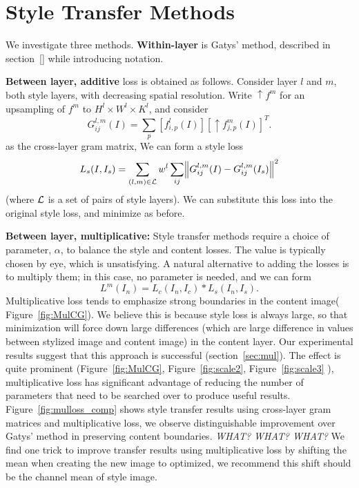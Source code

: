 \documentclass[runningheads]{llncs}
\begin{document}
\section{Style Transfer Methods}\label{sec:Cross}

We investigate three methods.  {\bf Within-layer}  is Gatys' method, described in section~\ref{} while introducing notation.

{\bf Between layer, additive} loss is obtained as follows.  Consider layer $l$ and $m$, both style layers, with decreasing
spatial resolution.  
Write $\uparrow f^{m}$ for an upsampling of  $f^m$ to $H^l\times W^l \times K^l$, and consider
\[
G_{ij}^{l,m}(I) = \sum_{p} \left[ f_{i,p}^l(I)\right]\left[\uparrow {f}_{j,p}^{m}(I)\right]^{T}.
\]
as the cross-layer gram matrix, We can form a style loss
\[
L_s(I, I_{s}) = \sum_{(l, m)\in {\cal L}} w^{l}\sum_{ij} \norm{G^{l,m}_{ij}(I)-G^{l,m}_{ij}(I_s)}^2
\]
(where ${\cal L}$ is a set of pairs of style layers).   We can substitute this loss into the original style loss, and
minimize as before. 

{\bf Between layer, multiplicative:} Style transfer methods require a choice of parameter, $\alpha$, to balance the style and content losses.   The value is
typically chosen by eye, which is unsatisfying.  A natural alternative to adding the losses is to multiply them; in this
case, no parameter is needed, and we can form
\[
L^m(I_n) = L_c(I_n, I_c) *  L_s(I_n, I_s).
\]
Multiplicative loss tends to emphasize strong boundaries in the content image( Figure~\ref{fig:MulCG}). We believe this
is because style loss is always large, so that minimization will force down large differences (which are large
difference in values between stylized image and content image) in the content layer.  Our experimental results suggest
that this approach is successful (section~\ref{sec:mul}).  The effect is quite prominent (Figure~\ref{fig:MulCG},
Figure~\ref{fig:scale2}, Figure~\ref{fig:scale3} ), multiplicative loss has significant advantage of reducing the number
of parameters that need to be searched over to produce useful results.  Figure~\ref{fig:mulloss_comp} shows style
transfer results using cross-layer gram matrices and multiplicative loss, we observe distinguishable improvement over
Gatys' method in preserving content boundaries.  {\em WHAT? WHAT? WHAT?} We find one trick to improve transfer results using multiplicative loss by shifting the mean when creating the new image
to optimized, we recommend this shift should be the channel mean of style image.
\end{document}
